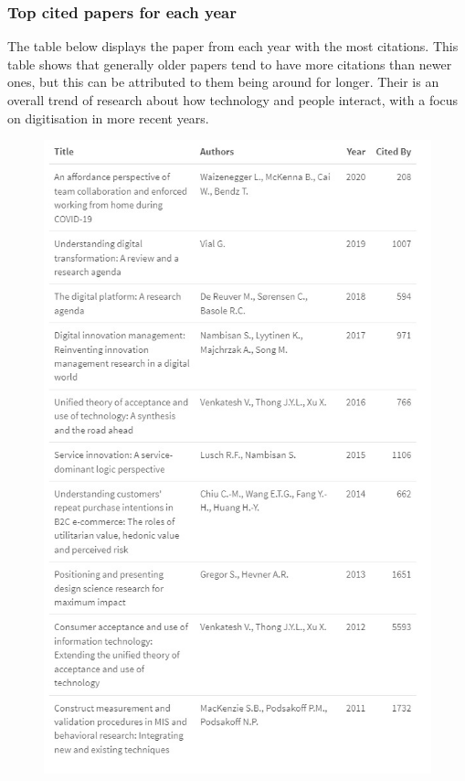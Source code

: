 \documentclass[
  letterpaper,
  DIV=11,
  numbers=noendperiod]{scrartcl}
\begin{document}
\hypertarget{top-cited-papers-for-each-year}{%
\subsubsection{Top cited papers for each
year}\label{top-cited-papers-for-each-year}}

The table below displays the paper from each year with the most
citations. This table shows that generally older papers tend to have
more citations than newer ones, but this can be attributed to them being
around for longer. Their is an overall trend of research about how
technology and people interact, with a focus on digitisation in more
recent years.

\begin{figure}

{\centering \includegraphics[width=4.6875in,height=\textheight]{images/topCitedPerYear.jpg}

}

\end{figure}
\end{document}

